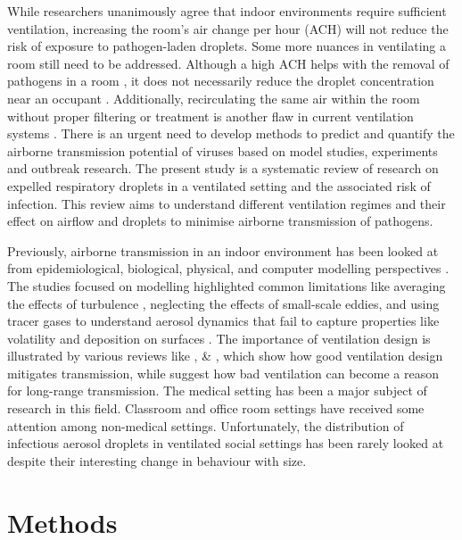 \documentclass[a4paper,12pt]{elsarticle}
\begin{document}
While researchers unanimously agree that indoor environments require sufficient ventilation, increasing the room's air change per hour (ACH) will not reduce the risk of exposure to pathogen-laden droplets. Some more nuances in ventilating a room still need to be addressed. Although a high ACH helps with the removal of pathogens in a room \cite{guo2022visualization, ho2021modeling}, it does not necessarily reduce the droplet concentration near an occupant \cite{arpino2023cfd}. Additionally, recirculating the same air within the room without proper filtering or treatment is another flaw in current ventilation systems \cite{li2021probable}. There is an urgent need to develop methods to predict and quantify the airborne transmission potential of viruses based on model studies, experiments and outbreak research. The present study is a systematic review of research on expelled respiratory droplets in a ventilated setting and the associated risk of infection. This review aims to understand different ventilation regimes and their effect on airflow and droplets to minimise airborne transmission of pathogens.

Previously, airborne transmission in an indoor environment has been looked at from epidemiological, biological, physical, and computer modelling perspectives \cite{argyropoulos2023airborne}. The studies focused on modelling highlighted common limitations like averaging the effects of turbulence \cite{mirzaie2021covid,dbouk2020respiratory},  neglecting the effects of small-scale eddies, and using tracer gases to understand aerosol dynamics that fail to capture properties like volatility and deposition on surfaces \cite{rayegan2022review, zhao2022airborne}. The importance of ventilation design is illustrated by various reviews like \cite{luongo2016role}, \cite{hobeika2023assessing} \& \cite{thornton2022impact}, which show how good ventilation design mitigates transmission, while \citet{correia2020airborne} suggest how bad ventilation can become a reason for long-range transmission. The medical setting has been a major subject of research in this field. Classroom and office room settings have received some attention among non-medical settings. Unfortunately, the distribution of infectious aerosol droplets in ventilated social settings has been rarely looked at despite their interesting change in behaviour with size.

\section{Methods}
\end{document}
